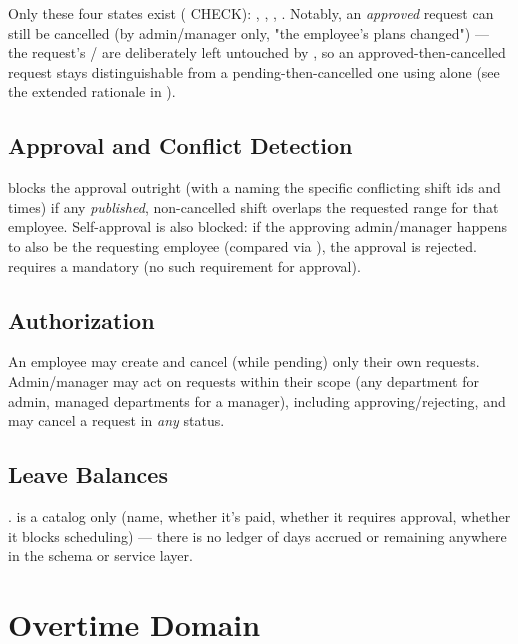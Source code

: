 Only these four states exist ( CHECK):
, , , .
Notably, an \emph{approved} request can still be cancelled (by
admin/manager only, "the employee's plans changed") --- the request's
/ are deliberately left
untouched by , so an approved-then-cancelled request
stays distinguishable from a pending-then-cancelled one using
 alone (see the extended rationale in
).

\subsection*{Approval and Conflict Detection}

 blocks the approval outright (with a
 naming the specific conflicting shift ids and
times) if any \emph{published}, non-cancelled shift overlaps the
requested range for that employee. Self-approval is also blocked: if
the approving admin/manager happens to also be the requesting employee
(compared via ), the approval is rejected.
 requires a mandatory 
(no such requirement for approval).

\subsection*{Authorization}

An employee may create and cancel (while pending) only their own
requests. Admin/manager may act on requests within their scope
(any department for admin, managed departments for a manager),
including approving/rejecting, and may cancel a request in \emph{any}
status.

\subsection*{Leave Balances}

\PLANNED{}.  is a catalog only (name, whether it's
paid, whether it requires approval, whether it blocks scheduling) ---
there is no ledger of days accrued or remaining anywhere in the schema
or service layer.

\section{Overtime Domain}

